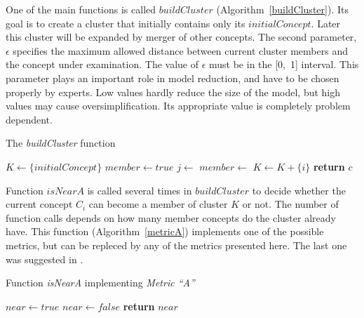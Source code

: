 \documentclass[graybox]{svmult}
\begin{document}
One of the main functions is called $buildCluster$ (Algorithm~\ref{buildCluster}). Its goal is to create a cluster that initially contains only its $initialConcept$. Later this cluster will be expanded by merger of other concepts. The second parameter, $\epsilon$ specifies the maximum allowed distance between current cluster members and the concept under examination. The value of $\epsilon$ must be in the [0,~1] interval. This parameter plays an important role in model reduction, and have to be chosen properly by experts. Low values hardly reduce the size of the model, but high values may cause oversimplification. Its appropriate value is completely problem dependent.

\begin{algorithm}
  \caption{The \emph{buildCluster} function}\label{buildCluster}
  \begin{algorithmic}[1]
    \State $K\gets \{initialConcept\}$
        \State $member \gets true$
          \State $j \gets$ 
          \State $member \gets$ 
        \EndWhile
          \State $K \gets K + \{i\}$
        \EndIf
      \EndIf
    \EndFor
    \State \textbf{return} $c$
    \EndFunction
  \end{algorithmic}
\end{algorithm}

Function $isNearA$ is called several times in $buildCluster$ to decide whether the current concept $C_i$ can become a member of cluster $K$ or not. The number of function calls depends on how many member concepts do the cluster already have. This function (Algorithm~\ref{metricA}) implements one of the possible metrics, but can be repleced by any of the metrics presented here. The last one was suggested in \cite{hatwagnerm.f.koczyl.t.2015}.

\begin{algorithm}
  \caption{Function \emph{isNearA} implementing \emph{Metric ``A''}}\label{metricA}
  \begin{algorithmic}[1]
      \State $near \gets true$
            \State $near \gets false$
          \EndIf
        \EndIf
      \EndFor
      \State \textbf{return} $near$
    \EndFunction
  \end{algorithmic}
\end{algorithm}
\end{document}
